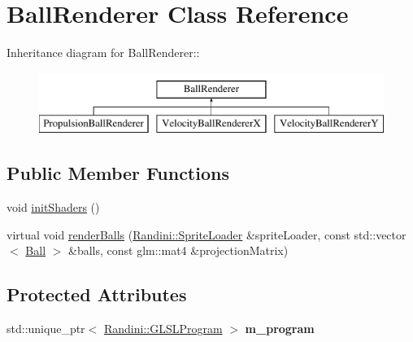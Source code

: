 \hypertarget{classBallRenderer}{
\section{BallRenderer Class Reference}
\label{classBallRenderer}
}
Inheritance diagram for BallRenderer::\begin{figure}[H]
\begin{center}
\leavevmode
\includegraphics[height=2cm]{classBallRenderer}
\end{center}
\end{figure}
\subsection*{Public Member Functions}
\begin{DoxyCompactItemize}
\item 
void \hyperlink{classBallRenderer_a6340a67dc1f573c71ea9934f35560256}{initShaders} ()
\item 
virtual void \hyperlink{classBallRenderer_a6169ba2a00e8d15fde87a3ee4552cf66}{renderBalls} (\hyperlink{classRandini_1_1SpriteLoader}{Randini::SpriteLoader} \&spriteLoader, const std::vector$<$ \hyperlink{structBall}{Ball} $>$ \&balls, const glm::mat4 \&projectionMatrix)
\end{DoxyCompactItemize}
\subsection*{Protected Attributes}
\begin{DoxyCompactItemize}
\item 
\hypertarget{classBallRenderer_a3e9fad7afb392a4be134536bbb4a209a}{
std::unique\_\-ptr$<$ \hyperlink{classRandini_1_1GLSLProgram}{Randini::GLSLProgram} $>$ {\bfseries m\_\-program}}
\label{classBallRenderer_a3e9fad7afb392a4be134536bbb4a209a}

\end{DoxyCompactItemize}


